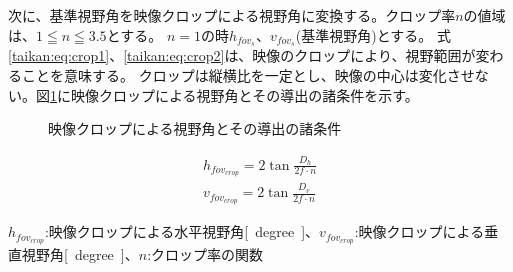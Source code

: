 次に、基準視野角を映像クロップによる視野角に変換する。クロップ率$n$の値域は、$1 \leqq n \leqq 3.5$とする。
$n = 1$の時$h_{fov_s}$、$v_{fov_s}$(基準視野角)とする。
式\eqref{taikan:eq:crop1}、\eqref{taikan:eq:crop2}は、映像のクロップにより、視野範囲が変わることを意味する。
クロップは縦横比を一定とし、映像の中心は変化させない。図\ref{taikan:shiyatocrop}に映像クロップによる視野角とその導出の諸条件を示す。
\clearpage
\begin{figure}[h]
  \begin{center}
  \caption{映像クロップによる視野角とその導出の諸条件}
  \label{taikan:shiyatocrop}
  \end{center}
\end{figure}

\begin{align}
  h_{fov_{crop}} = 2\tan{\frac{D_h}{2f\cdot n}} \label{taikan:eq:crop1}\\
  v_{fov_{crop}} = 2\tan{\frac{D_v}{2f\cdot n}} \label{taikan:eq:crop2}
\end{align}

$h_{fov_{crop}}$:映像クロップによる水平視野角\si{[degree]}、$v_{fov_{crop}}$:映像クロップによる垂直視野角\si{[degree]}、$n$:クロップ率の関数

